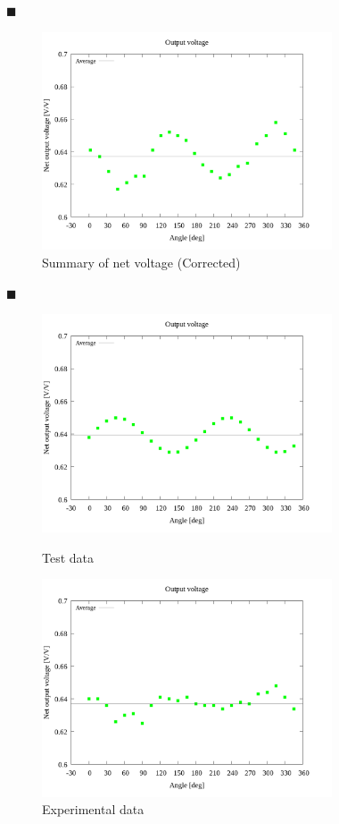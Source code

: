 \documentclass[twocolumn,a4j]{jsarticle}
\begin{document}
$\blacksquare$ 

\begin{figure}[htbp]
    \footnotesize
    \begin{center}
        \includegraphics[width=86mm]{../graphes/1-ex/09/09_summary-outputvoltage-net.png}
        \caption{Summary of net voltage (Corrected)}
    \end{center}
\end{figure}

\newpage

$\blacksquare$ 

\begin{figure}[htbp]
    \footnotesize
    \begin{center}
        \includegraphics[width=86mm]{../graphes/simulation/05/05_summary-outputvoltage.png}
        \caption{Test data}
        \includegraphics[width=86mm]{../graphes/1-ex/05/05_summary-outputvoltage.png}
        \caption{Experimental data}
    \end{center}
\end{figure}
\end{document}
